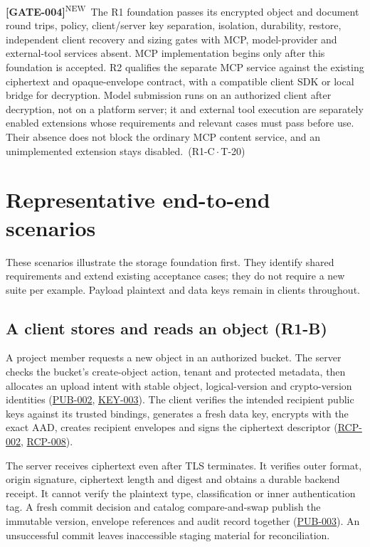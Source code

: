 \documentclass[11pt,a4paper]{article}
\newcommand{\rr}[1]{\hyperlink{req:#1}{#1}}
\newcommand{\reqtag}[2]{{\footnotesize\color{accent}(#1\,$\cdot$\,#2)}}
\newcommand{\reqn}[4]{\par\noindent\hypertarget{req:#1}{\textbf{[#1]}}\textsuperscript{\color{accent}\tiny NEW}\ #4\ \reqtag{#2}{#3}\par}
\begin{document}
\reqn{GATE-004}{R1-C}{T-20}{The R1 foundation passes its encrypted object and document round trips, policy, client/server key separation, isolation, durability, restore, independent client recovery and sizing gates with MCP, model-provider and external-tool services absent. MCP implementation begins only after this foundation is accepted. R2 qualifies the separate MCP service against the existing ciphertext and opaque-envelope contract, with a compatible client SDK or local bridge for decryption. Model submission runs on an authorized client after decryption, not on a platform server; it and external tool execution are separately enabled extensions whose requirements and relevant cases must pass before use. Their absence does not block the ordinary MCP content service, and an unimplemented extension stays disabled.}

\appendix


\section{Representative end-to-end scenarios}\label{app:scenarios}
These scenarios illustrate the storage foundation first. They identify shared requirements and extend existing acceptance cases; they do not require a new suite per example. Payload plaintext and data keys remain in clients throughout.

\subsection{A client stores and reads an object (R1-B)}
A project member requests a new object in an authorized bucket. The server checks the bucket's create-object action, tenant and protected metadata, then allocates an upload intent with stable object, logical-version and crypto-version identities (\rr{PUB-002}, \rr{KEY-003}). The client verifies the intended recipient public keys against its trusted bindings, generates a fresh data key, encrypts with the exact AAD, creates recipient envelopes and signs the ciphertext descriptor (\rr{RCP-002}, \rr{RCP-008}).

The server receives ciphertext even after TLS terminates. It verifies outer format, origin signature, ciphertext length and digest and obtains a durable backend receipt. It cannot verify the plaintext type, classification or inner authentication tag. A fresh commit decision and catalog compare-and-swap publish the immutable version, envelope references and audit record together (\rr{PUB-003}). An unsuccessful commit leaves inaccessible staging material for reconciliation.
\end{document}
